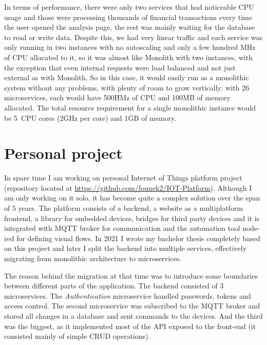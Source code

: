 In terms of performance, there were only two services that had noticeable CPU usage and those were processing thousands of financial transactions every time the user opened the analysis page, the rest was mainly waiting for the database to read or write data. Despite this, we had very linear traffic and each service was only running in two instances with no autoscaling and only a few hundred MHz of CPU allocated to it, so it was almost like Monolith with two instances, with the exception that even internal requests were load balanced and not just external as with Monolith. So in this case, it would easily run as a monolithic system without any problems, with plenty of room to grow vertically: with 26 microservices, each would have 500\.HMz of CPU and 100\.MB of memory allocated. The total resource requirement for a single monolithic instance would be 5~CPU cores (2\.GHz per core) and 1\.GB of memory.


\section{Personal project}
In spare time I am working on personal Internet of Things platform project (repository located at \href{https://github.com/founek2/IOT-Platform}{https://github.com/founek2/IOT-Platform}). Although I am only working on it solo, it has become quite a complex solution over the span of 5 years. The platform consists of a backend, a website as a multiplatform frontend, a library for embedded devices, bridges for third party devices and it is integrated with MQTT broker for communication and the automation tool node-red for defining visual flows. In 2021 I wrote my bachelor thesis completely based on this project and later I split the backend into multiple services, effectively migrating from monolithic architecture to microservices.

The reason behind the migration at that time was to introduce some boundaries between different parts of the application. The backend consisted of 3 microservices. The \textit{Authentication} microservice handled passwords, tokens and access control. The second microservice was subscribed to the MQTT broker and stored all changes in a database and sent commands to the devices. And the third was the biggest, as it implemented most of the API exposed to the front-end (it consisted mainly of simple CRUD operations).

